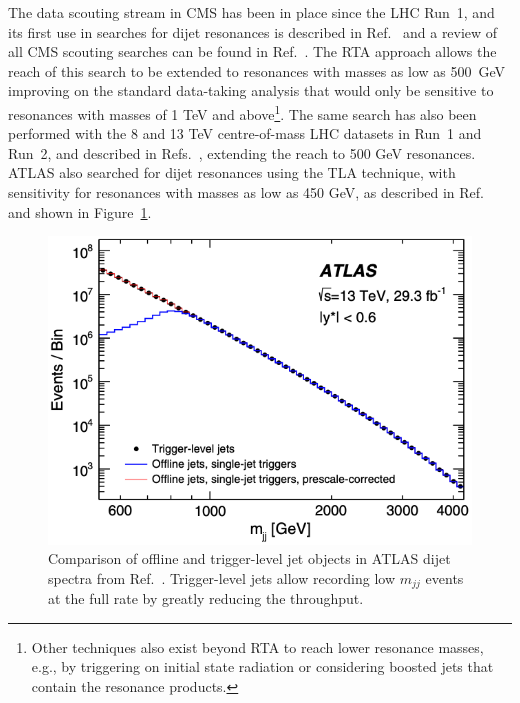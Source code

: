 \fi



The data scouting stream in CMS has been in place since the LHC Run~1, and its first use in searches for dijet resonances is described in Ref.~\cite{CMS:dijet-7tev-resonances} and a review of all CMS scouting searches can be found in Ref.~\cite{CMS:2024zhe}. The RTA approach allows the reach of this search to be extended to resonances with masses as low as \SI{500}{\giga\electronvolt} improving on the standard data-taking analysis that would only be sensitive to resonances with masses of 1 TeV and above\footnote{Other techniques also exist beyond RTA to reach lower resonance masses, e.g., by triggering on initial state radiation or considering boosted jets that contain the resonance products.}. The same search has also been performed with the 8 and 13 TeV centre-of-mass LHC datasets in Run~1 and Run~2, and described in Refs.~\cite{CMS:2016ltu, CMS:2016gsl}, extending the reach to 500 GeV resonances. ATLAS also searched for dijet resonances using the TLA technique, with sensitivity for resonances with masses as low as 450 GeV, as described in Ref.~\cite{ATLAS:2018qto} and shown in Figure~\ref{fig:trigger-level-efficiencies}.

\begin{figure}[!ht]
    \centering
    \includegraphics[width=0.55\linewidth]{images/ATLAS-TLA.png}
    \caption{Comparison of offline and trigger-level jet objects in ATLAS dijet spectra from Ref.~\cite{ATLAS:2018qto}. Trigger-level jets allow recording low $m_{jj}$ events at the full rate by greatly reducing the throughput.}
    \label{fig:trigger-level-efficiencies}
\end{figure}

